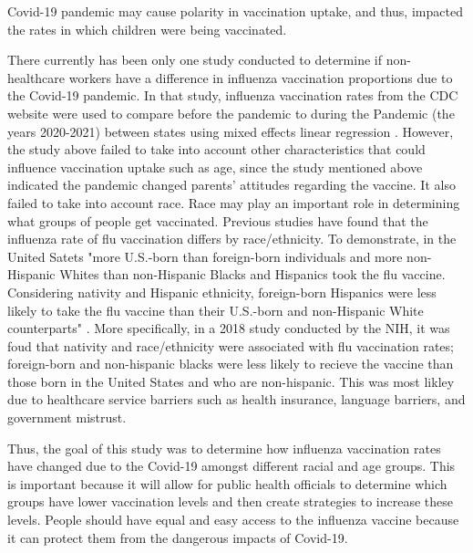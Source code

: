 \documentclass[12pt]{article}
\begin{document}
Covid-19 pandemic may cause polarity in vaccination uptake, and thus, impacted the rates in which children were being vaccinated. \par
There currently has been only one study conducted to determine if non-healthcare workers have a difference in influenza vaccination proportions due to the Covid-19 pandemic. In that study, influenza vaccination rates from the CDC website were used to compare before the pandemic to during the Pandemic
(the years 2020-2021) between states using mixed effects linear regression \citep{leuchter2022association}.
However, the study above failed to take into account other characteristics that could influence vaccination uptake such as age, since the study mentioned above indicated the pandemic changed parents' attitudes regarding the vaccine. It also failed to take into account race. Race may play an important role
in determining what groups of people get vaccinated. Previous studies have found that the influenza rate of flu vaccination differs by race/ethnicity. To demonstrate, in the United Satets "more U.S.-born than foreign-born individuals and more non-Hispanic Whites than non-Hispanic Blacks and Hispanics 
took the flu vaccine. Considering nativity and Hispanic ethnicity, foreign-born Hispanics were less likely to take the flu vaccine than their U.S.-born and non-Hispanic White counterparts" \citep{jang2021factors}. More specifically, in a 2018 study conducted by the NIH, it was foud that nativity and race/ethnicity were
associated with flu vaccination rates; foreign-born and non-hispanic blacks were less likely to recieve the vaccine than those born in the United States and who are non-hispanic. This was most likley due to healthcare service barriers such as health insurance, language barriers, and government mistrust. \par
Thus, the goal of this study was to determine how influenza vaccination rates have changed due to the Covid-19 amongst different racial and age groups. This is important because it will allow for public health officials to determine which groups have lower vaccination levels and then create strategies to increase these levels.
People should have equal and easy access to the influenza vaccine because it can protect them from the dangerous impacts of Covid-19.
\end{document}

